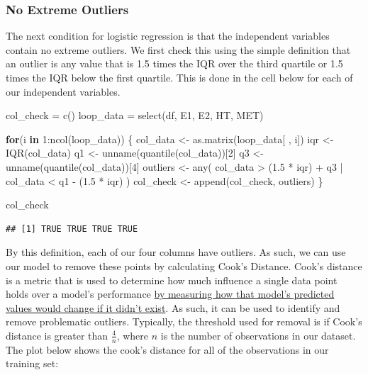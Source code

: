 \documentclass[
]{article}
\newenvironment{Shaded}{\begin{snugshade}}{\end{snugshade}}
\newcommand{\ControlFlowTok}[1]{\textcolor[rgb]{0.13,0.29,0.53}{\textbf{#1}}}
\newcommand{\DecValTok}[1]{\textcolor[rgb]{0.00,0.00,0.81}{#1}}
\newcommand{\FloatTok}[1]{\textcolor[rgb]{0.00,0.00,0.81}{#1}}
\newcommand{\FunctionTok}[1]{\textcolor[rgb]{0.00,0.00,0.00}{#1}}
\newcommand{\NormalTok}[1]{#1}
\newcommand{\OtherTok}[1]{\textcolor[rgb]{0.56,0.35,0.01}{#1}}
\newcommand{\SpecialCharTok}[1]{\textcolor[rgb]{0.00,0.00,0.00}{#1}}
\begin{document}
\hypertarget{no-extreme-outliers}{%
\subsubsection{No Extreme Outliers}\label{no-extreme-outliers}}

The next condition for logistic regression is that the independent
variables contain no extreme outliers. We first check this using the
simple definition that an outlier is any value that is 1.5 times the IQR
over the third quartile or 1.5 times the IQR below the first quartile.
This is done in the cell below for each of our independent variables.

\begin{Shaded}
\begin{Highlighting}[]
\NormalTok{col\_check }\OtherTok{=} \FunctionTok{c}\NormalTok{()}
\NormalTok{loop\_data }\OtherTok{=} \FunctionTok{select}\NormalTok{(df, E1, E2, HT, MET)}

\ControlFlowTok{for}\NormalTok{(i }\ControlFlowTok{in} \DecValTok{1}\SpecialCharTok{:}\FunctionTok{ncol}\NormalTok{(loop\_data)) \{       }
\NormalTok{  col\_data }\OtherTok{\textless{}{-}} \FunctionTok{as.matrix}\NormalTok{(loop\_data[ , i])}
\NormalTok{  iqr }\OtherTok{\textless{}{-}} \FunctionTok{IQR}\NormalTok{(col\_data)}
\NormalTok{  q1 }\OtherTok{\textless{}{-}} \FunctionTok{unname}\NormalTok{(}\FunctionTok{quantile}\NormalTok{(col\_data))[}\DecValTok{2}\NormalTok{]}
\NormalTok{  q3 }\OtherTok{\textless{}{-}} \FunctionTok{unname}\NormalTok{(}\FunctionTok{quantile}\NormalTok{(col\_data))[}\DecValTok{4}\NormalTok{]}
\NormalTok{  outliers }\OtherTok{\textless{}{-}} 
    \FunctionTok{any}\NormalTok{(}
\NormalTok{      col\_data }\SpecialCharTok{\textgreater{}}\NormalTok{ (}\FloatTok{1.5} \SpecialCharTok{*}\NormalTok{ iqr) }\SpecialCharTok{+}\NormalTok{ q3 }\SpecialCharTok{|}
\NormalTok{      col\_data }\SpecialCharTok{\textless{}}\NormalTok{ q1 }\SpecialCharTok{{-}}\NormalTok{ (}\FloatTok{1.5} \SpecialCharTok{*}\NormalTok{ iqr)}
\NormalTok{    )}
\NormalTok{  col\_check }\OtherTok{\textless{}{-}} \FunctionTok{append}\NormalTok{(col\_check, outliers)}
\NormalTok{\}}

\NormalTok{col\_check}
\end{Highlighting}
\end{Shaded}

\begin{verbatim}
## [1] TRUE TRUE TRUE TRUE
\end{verbatim}

By this definition, each of our four columns have outliers. As such, we
can use our model to remove these points by calculating Cook's Distance.
Cook's distance is a metric that is used to determine how much influence
a single data point holds over a model's performance
\href{https://www.jstor.org/stable/1268249}{by measuring how that
model's predicted values would change if it didn't exist}. As such, it
can be used to identify and remove problematic outliers. Typically, the
threshold used for removal is if Cook's distance is greater than
\(\frac{4}{n}\), where \(n\) is the number of observations in our
dataset. The plot below shows the cook's distance for all of the
observations in our training set:
\end{document}
